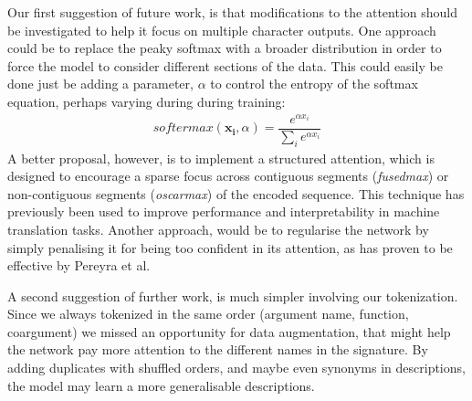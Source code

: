 Our first suggestion of future work, is that modifications to the attention should be investigated to help it focus on multiple character outputs. 
One approach could be to replace the peaky softmax with a broader distribution in order to force the model to consider different sections of the data.
This could easily be done just be adding a parameter, $\alpha$ to control the entropy of the softmax equation, perhaps varying during during training:
\begin{align}
softermax(\mathbf{x_i}, \alpha) = \dfrac{e^{{\alpha}x_i}}{\sum_ie^{{\alpha}x_i}}
\end{align}
A better proposal, however, is to implement a structured attention, which is designed to encourage a sparse focus across contiguous segments (\textit{fusedmax}) or non-contiguous segments (\textit{oscarmax}) of the encoded sequence. \cite{niculae_regularized_2017}
This technique has previously been used to improve performance and interpretability in machine translation tasks. 
Another approach, would be to regularise the network by simply penalising it for being too confident in its attention, as has proven to be effective by Pereyra et al\cite{pereyra_regularizing_2017}.

A second suggestion of further work, is much simpler involving our tokenization. Since we always tokenized in the same order (argument name, function, coargument) we missed an opportunity for data augmentation, that might help the network pay more attention to the different names in the signature. By adding duplicates with shuffled orders, and maybe even synonyms in descriptions, the model may learn a more generalisable descriptions.


